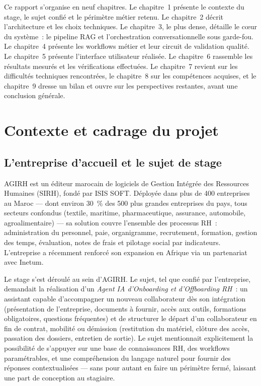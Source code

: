 \documentclass[12pt,a4paper]{article}
\begin{document}
Ce rapport s'organise en neuf chapitres. Le chapitre~1 pr\'esente le contexte du stage, le sujet confi\'e et le p\'erim\`etre m\'etier retenu. Le chapitre~2 d\'ecrit l'architecture et les choix techniques. Le chapitre~3, le plus dense, d\'etaille le c\oe{}ur du syst\`eme~: le pipeline RAG et l'orchestration conversationnelle sous garde-fou. Le chapitre~4 pr\'esente les workflows m\'etier et leur circuit de validation qualit\'e. Le chapitre~5 pr\'esente l'interface utilisateur r\'ealis\'ee. Le chapitre~6 rassemble les r\'esultats mesur\'es et les v\'erifications effectu\'ees. Le chapitre~7 revient sur les difficult\'es techniques rencontr\'ees, le chapitre~8 sur les comp\'etences acquises, et le chapitre~9 dresse un bilan et ouvre sur les perspectives restantes, avant une conclusion g\'en\'erale.

\newpage
\section{Contexte et cadrage du projet}

\subsection{L'entreprise d'accueil et le sujet de stage}

AGIRH est un \'editeur marocain de logiciels de Gestion Int\'egr\'ee des Ressources Humaines (SIRH), fond\'e par ISIS SOFT. D\'eploy\'ee dans plus de 400 entreprises au Maroc --- dont environ 30~\% des 500 plus grandes entreprises du pays, tous secteurs confondus (textile, maritime, pharmaceutique, assurance, automobile, agroalimentaire) --- sa solution couvre l'ensemble des processus RH~: administration du personnel, paie, organigramme, recrutement, formation, gestion des temps, \'evaluation, notes de frais et pilotage social par indicateurs. L'entreprise a r\'ecemment renforc\'e son expansion en Afrique via un partenariat avec Inetum.

Le stage s'est d\'eroul\'e au sein d'AGIRH. Le sujet, tel que confi\'e par l'entreprise, demandait la r\'ealisation d'un \textit{Agent IA d'Onboarding et d'Offboarding RH}~: un assistant capable d'accompagner un nouveau collaborateur d\`es son int\'egration (pr\'esentation de l'entreprise, documents \`a fournir, acc\`es aux outils, formations obligatoires, questions fr\'equentes) et de structurer le d\'epart d'un collaborateur en fin de contrat, mobilit\'e ou d\'emission (restitution du mat\'eriel, cl\^oture des acc\`es, passation des dossiers, entretien de sortie). Le sujet mentionnait explicitement la possibilit\'e de s'appuyer sur une base de connaissances RH, des workflows param\'etrables, et une compr\'ehension du langage naturel pour fournir des r\'eponses contextualis\'ees --- sans pour autant en faire un p\'erim\`etre ferm\'e, laissant une part de conception au stagiaire.
\end{document}
